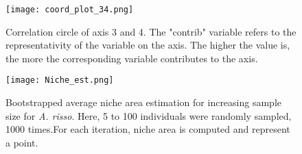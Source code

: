 \begin{figure} [!htbp]
	\begin{center}
		\texttt{[image: coord\_plot\_34.png]}
	\end{center}
	\caption[FAMD's correlation circle for third and fourth axis]{Correlation circle of axis 3 and 4. The "contrib" variable refers to the representativity of the variable on the axis. The higher the value is, the more the corresponding variable contributes to the axis.}
	\label{fig:corr_circ_34}
\end{figure}

\begin{figure} [!htbp]
	\begin{center}
		\texttt{[image: Niche\_est.png]}
	\end{center}
	\caption[Sample size on the estimate of the average niche area]{Bootstrapped average niche area estimation for increasing sample size for \textit{A. risso}. Here, 5 to 100 individuals were randomly sampled, 1000 times.For each iteration, niche area is computed and represent a point.}
	\label{fig:niche_est}
\end{figure}

